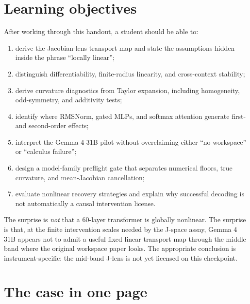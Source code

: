\documentclass[11pt]{article}
\theoremstyle{definition}
\theoremstyle{remark}
\begin{document}
\tableofcontents
\clearpage
{}

\section*{Learning objectives}
After working through this handout, a student should be able to:
\begin{enumerate}
  \item derive the Jacobian-lens transport map and state the assumptions hidden inside the phrase ``locally linear'';
  \item distinguish differentiability, finite-radius linearity, and cross-context stability;
  \item derive curvature diagnostics from Taylor expansion, including homogeneity, odd-symmetry, and additivity tests;
  \item identify where RMSNorm, gated MLPs, and softmax attention generate first- and second-order effects;
  \item interpret the Gemma 4 31B pilot without overclaiming either ``no workspace'' or ``calculus failure'';
  \item design a model-family preflight gate that separates numerical floors, true curvature, and mean-Jacobian cancellation;
  \item evaluate nonlinear recovery strategies and explain why successful decoding is not automatically a causal intervention license.
\end{enumerate}

\begin{takeawaybox}
The surprise is \emph{not} that a 60-layer transformer is globally nonlinear. The surprise is that, at the finite intervention scales needed by the J-space assay, Gemma 4 31B appears not to admit a useful fixed linear transport map through the middle band where the original workspace paper looks. The appropriate conclusion is instrument-specific: the mid-band J-lens is not yet licensed on this checkpoint.
\end{takeawaybox}

\section{The case in one page}
\end{document}
